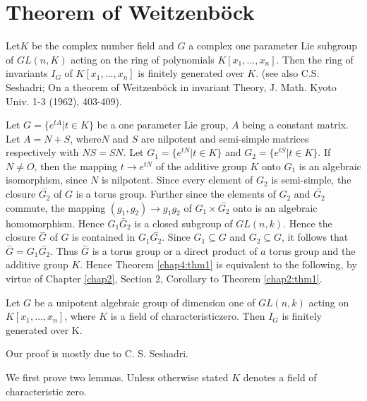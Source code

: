 \chapter{Theorem of Weitzenb\"ock}%

\setcounter{thm}{0}
\begin{thm}\label{chap4:thm1}%
    Let\pageoriginale $K$ be the complex number field and $G$ a 
    complex one parameter Lie subgroup of $GL(n,K)$ acting on the ring of
    polynomials $K[x_1,...,x_n]$. Then the ring of invariants $I_G$ of
    $K[x_1,...,x_n]$ is finitely generated over $K$. (see 
        also C.S. Seshadri; On a theorem of Weitzenb\"ock in invariant
        Theory, J. Math. Kyoto Univ. 1-3 (1962), 403-409). 
  \end{thm} 
 
 Let $G=\{e^{tA}|t \in K\}$ be a one parameter Lie group, $A$ being a
 constant matrix. Let $A=N+S$, where$ N$ and $S$ are nilpotent and
 semi-simple matrices respectively with $NS=SN$. Let
 $G_1=\{e^{tN}|t \in K\}$ and $G_2=\{e^{tS}|t \in K\}$. If $N \neq
 O$, then the mapping $t \to e^{tN}$ of the additive group $K$ onto
 $G_1$ is an algebraic isomorphism, since $N$ is nilpotent. Since
 every element of $G_2$ is semi-simple, the closure
 $\overset{-}{G_2}$ of $G$ is a torus group. Further since the
 elements of $G_2$ and $\overset{-}{G_2}$ commute, the mapping $(g_1,
 g_2)\rightarrow g_1 g_2$ of $G_1 \times \overset{-}{G_2}$ onto 
 is an algebraic homomorphism. Hence $G_1 \bar{G}_2$ is a closed subgroup
 of $ GL (n,k)$. Hence the closure $\overset{-}{G}$ of $G$ is
 contained in $G_1  \overset{-}{G_2}$. Since $G_1 \subseteq G$
 and $G_2 \subseteq G$, it follows that $\overset{-}{G} =
 G_1  \overset{-}{G_2}$. Thus $\overset{-}{G}$ is a torus group or
 a direct product of $a$ torus group and the additive group $K$. Hence
 Theorem \ref{chap4:thm1} is equivalent to the following, by virtue of
 Chapter \ref{chap2}, Section 2, Corollary to Theorem \ref{chap2:thm1}. 

 \begin{thm}%
   Let $G$ be a unipotent algebraic group of dimension one of $GL(n, k)$
   acting on $K[x_1 , \ldots, x_n]$, where $K$ is a field of
   characteristic\pageoriginale zero. Then $I_G$ is finitely generated
   over K.   
 \end{thm} 
 
 Our proof is mostly due to C. S. Seshadri.
 
 We first prove two lemmas. Unless otherwise stated $K$ denotes a
 field of characteristic zero. 

